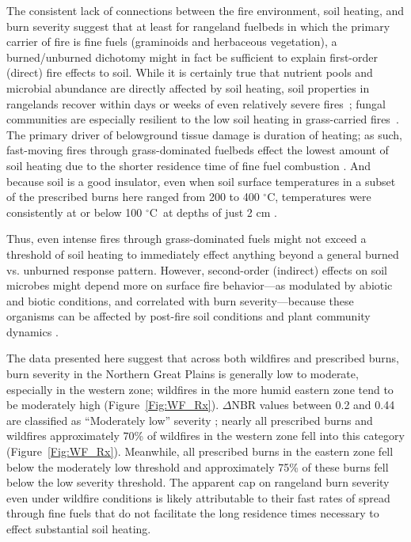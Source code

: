 \documentclass[fire,article,accept,oneauthor,pdftex]{Definitions/mdpi}
\newcommand{\degC}{$^\circ$C}
\begin{document}
The consistent lack of connections between the fire environment, soil heating, and burn severity suggest that at least for rangeland fuelbeds in which the primary carrier of fire is fine fuels (graminoids and herbaceous vegetation), a burned/unburned dichotomy might in fact be sufficient to explain first-order (direct) fire effects to soil. 
While it is certainly true that nutrient pools and microbial abundance are directly affected by soil heating, soil properties in rangelands recover within days or weeks of even relatively severe fires~\cite{mcgranahan2022,docherty2012}; fungal communities are especially resilient to the low soil heating in grass-carried fires~\cite{egidi2016}. 
The primary driver of belowground tissue damage is duration of heating; as such, fast-moving fires through grass-dominated fuelbeds effect the lowest amount of soil heating due to the shorter residence time of fine fuel combustion \cite{neary1999a, robichaud2000}. 
And because soil is a good insulator, even when soil surface temperatures in a subset of the prescribed burns here ranged from 200 to 400 \degC, temperatures were consistently at or below 100 \degC~at depths of just 2 cm \cite{mcgranahan2022}. 

Thus, even intense fires through grass-dominated fuels might not exceed a threshold of soil heating to immediately effect anything beyond a general burned vs. unburned response pattern. 
However, second-order (indirect) effects on soil microbes might depend more on surface fire behavior---as modulated by abiotic and biotic conditions, and correlated with burn severity---because these organisms can be affected by post-fire soil conditions and plant community dynamics \cite{neary1999a}.


The data presented here suggest that across both wildfires and prescribed burns, burn severity in the Northern Great Plains is generally low to moderate, especially in the western zone; wildfires in the more humid eastern zone tend to be moderately high (Figure~\ref{Fig:WF_Rx}).
$\Delta$NBR values between 0.2 and 0.44 are classified as ``Moderately low'' severity \cite{key2006a}; nearly all prescribed burns and wildfires approximately 70\% of wildfires in the western zone fell into this category (Figure~\ref{Fig:WF_Rx}). 
Meanwhile, all prescribed burns in the eastern zone fell below the moderately low threshold and approximately 75\% of these burns fell below the low severity threshold. 
The apparent cap on rangeland burn severity even under wildfire conditions is likely attributable to their fast rates of spread through fine fuels that do not facilitate the long residence times necessary to effect substantial soil heating.
\end{document}
